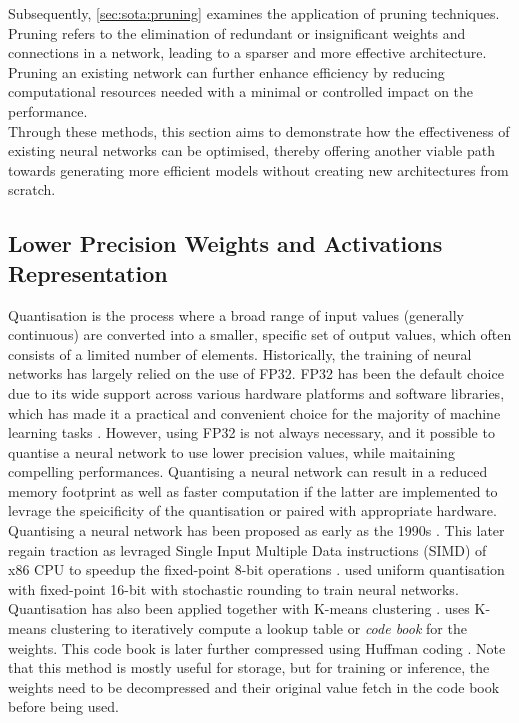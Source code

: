 Subsequently, \cref{sec:sota:pruning} examines the application of
pruning techniques. Pruning refers to the elimination of redundant or
insignificant weights and connections in a network, leading to a sparser and
more effective architecture. Pruning an existing network can further enhance
efficiency by reducing computational resources needed with a minimal or
controlled impact on the performance.\\

Through these methods, this section aims to demonstrate how the effectiveness of
existing neural networks can be optimised, thereby offering another viable path
towards generating more efficient models without creating new architectures from
scratch.\\

\subsection{Lower Precision Weights and Activations Representation}\label{sec:sota:quantisation}

Quantisation is the process where a broad range of input values (generally
continuous) are converted into a smaller, specific set of output values, which
often consists of a limited number of elements. Historically, the training of
neural networks has largely relied on the use of \ac{FP32}. FP32 has been the
default choice due to its wide support across various hardware platforms and
software libraries, which has made it a practical and convenient choice for the
majority of machine learning tasks \cite{sze2017efficient}. However, using
\acl{FP32} is not always necessary, and it possible to quantise a neural network
to use lower precision values, while maitaining compelling performances.
Quantising a neural network can result in a reduced memory footprint as well as
faster computation if the latter are implemented to levrage the speicificity of
the quantisation or paired with appropriate hardware.\\

Quantising a neural network has been proposed as early as the 1990s
\cite{balzer1991weight,fiesler1990weight}. This later regain traction as
\citeauthor{37631} levraged Single Input Multiple Data instructions (SIMD) of
x86 \ac{CPU} to speedup the fixed-point 8-bit operations \cite{37631}.
\citeauthor{gupta2015deep} used uniform quantisation with fixed-point 16-bit
with stochastic rounding to train neural networks. Quantisation has also been
applied together with K-means clustering \cite{steinhaus1956division}.
\cite{DBLP:journals/corr/HanMD15} uses K-means clustering to iteratively compute
a lookup table or \emph{code book} for the weights. This code book is later
further compressed using Huffman coding \cite{huffman1952method}. Note that this
method is mostly useful for storage, but for training or inference, the weights
need to be decompressed and their original value fetch in the code book before
being used.\\

